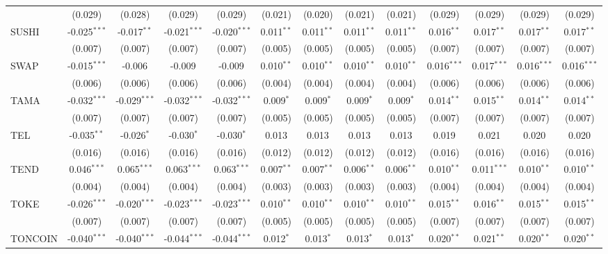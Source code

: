 \begin{table}[!htbp]
\begin{tabular}{@{\extracolsep{5pt}}lcccccccccccc}
  & (0.029) & (0.028) & (0.029) & (0.029) & (0.021) & (0.020) & (0.021) & (0.021) & (0.029) & (0.029) & (0.029) & (0.029) \\
 SUSHI & -0.025$^{***}$ & -0.017$^{**}$ & -0.021$^{***}$ & -0.020$^{***}$ & 0.011$^{**}$ & 0.011$^{**}$ & 0.011$^{**}$ & 0.011$^{**}$ & 0.016$^{**}$ & 0.017$^{**}$ & 0.017$^{**}$ & 0.017$^{**}$ \\
  & (0.007) & (0.007) & (0.007) & (0.007) & (0.005) & (0.005) & (0.005) & (0.005) & (0.007) & (0.007) & (0.007) & (0.007) \\
 SWAP & -0.015$^{***}$ & -0.006$^{}$ & -0.009$^{}$ & -0.009$^{}$ & 0.010$^{**}$ & 0.010$^{**}$ & 0.010$^{**}$ & 0.010$^{**}$ & 0.016$^{***}$ & 0.017$^{***}$ & 0.016$^{***}$ & 0.016$^{***}$ \\
  & (0.006) & (0.006) & (0.006) & (0.006) & (0.004) & (0.004) & (0.004) & (0.004) & (0.006) & (0.006) & (0.006) & (0.006) \\
 TAMA & -0.032$^{***}$ & -0.029$^{***}$ & -0.032$^{***}$ & -0.032$^{***}$ & 0.009$^{*}$ & 0.009$^{*}$ & 0.009$^{*}$ & 0.009$^{*}$ & 0.014$^{**}$ & 0.015$^{**}$ & 0.014$^{**}$ & 0.014$^{**}$ \\
  & (0.007) & (0.007) & (0.007) & (0.007) & (0.005) & (0.005) & (0.005) & (0.005) & (0.007) & (0.007) & (0.007) & (0.007) \\
 TEL & -0.035$^{**}$ & -0.026$^{*}$ & -0.030$^{*}$ & -0.030$^{*}$ & 0.013$^{}$ & 0.013$^{}$ & 0.013$^{}$ & 0.013$^{}$ & 0.019$^{}$ & 0.021$^{}$ & 0.020$^{}$ & 0.020$^{}$ \\
  & (0.016) & (0.016) & (0.016) & (0.016) & (0.012) & (0.012) & (0.012) & (0.012) & (0.016) & (0.016) & (0.016) & (0.016) \\
 TEND & 0.046$^{***}$ & 0.065$^{***}$ & 0.063$^{***}$ & 0.063$^{***}$ & 0.007$^{**}$ & 0.007$^{**}$ & 0.006$^{**}$ & 0.006$^{**}$ & 0.010$^{**}$ & 0.011$^{***}$ & 0.010$^{**}$ & 0.010$^{**}$ \\
  & (0.004) & (0.004) & (0.004) & (0.004) & (0.003) & (0.003) & (0.003) & (0.003) & (0.004) & (0.004) & (0.004) & (0.004) \\
 TOKE & -0.026$^{***}$ & -0.020$^{***}$ & -0.023$^{***}$ & -0.023$^{***}$ & 0.010$^{**}$ & 0.010$^{**}$ & 0.010$^{**}$ & 0.010$^{**}$ & 0.015$^{**}$ & 0.016$^{**}$ & 0.015$^{**}$ & 0.015$^{**}$ \\
  & (0.007) & (0.007) & (0.007) & (0.007) & (0.005) & (0.005) & (0.005) & (0.005) & (0.007) & (0.007) & (0.007) & (0.007) \\
 TONCOIN & -0.040$^{***}$ & -0.040$^{***}$ & -0.044$^{***}$ & -0.044$^{***}$ & 0.012$^{*}$ & 0.013$^{*}$ & 0.013$^{*}$ & 0.013$^{*}$ & 0.020$^{**}$ & 0.021$^{**}$ & 0.020$^{**}$ & 0.020$^{**}$ \\

\end{tabular}
\end{table}
